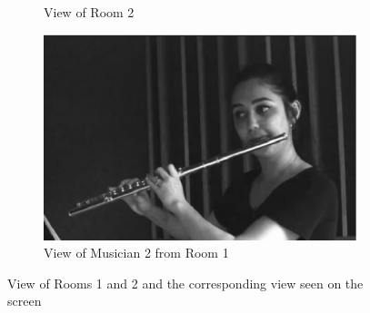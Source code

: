 \begin{figure}[t]
\begin{subfigure}[t]{\columnwidth}
		\caption{View of Room 2}
	\label{subfig:fs}
	\end{subfigure}
	\begin{subfigure}[t]{\columnwidth}
	\centering        
	\includegraphics[width=\textwidth]{img/fv.eps}
	\caption{View of Musician 2 from Room 1}
	\label{subfig:fv}
\end{subfigure}

	\quad 
	\caption{View of Rooms 1 and 2 and the corresponding view seen on the screen}\label{fig:afsv}

\end{figure}

